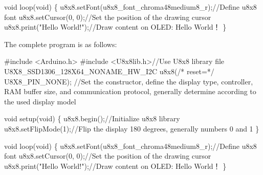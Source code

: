 \documentclass[
  letterpaper,
  DIV=11,
  numbers=noendperiod]{scrreprt}
\newenvironment{Shaded}{\begin{snugshade}}{\end{snugshade}}
\newcommand{\CommentTok}[1]{\textcolor[rgb]{0.37,0.37,0.37}{#1}}
\newcommand{\DataTypeTok}[1]{\textcolor[rgb]{0.68,0.00,0.00}{#1}}
\newcommand{\DecValTok}[1]{\textcolor[rgb]{0.68,0.00,0.00}{#1}}
\newcommand{\ImportTok}[1]{\textcolor[rgb]{0.00,0.46,0.62}{#1}}
\newcommand{\NormalTok}[1]{\textcolor[rgb]{0.00,0.23,0.31}{#1}}
\newcommand{\OperatorTok}[1]{\textcolor[rgb]{0.37,0.37,0.37}{#1}}
\newcommand{\PreprocessorTok}[1]{\textcolor[rgb]{0.68,0.00,0.00}{#1}}
\newcommand{\StringTok}[1]{\textcolor[rgb]{0.13,0.47,0.30}{#1}}
\begin{document}
\begin{Shaded}
\begin{Highlighting}[]
\DataTypeTok{void}\NormalTok{ loop}\OperatorTok{(}\DataTypeTok{void}\OperatorTok{)} \OperatorTok{\{}
\NormalTok{    u8x8}\OperatorTok{.}\NormalTok{setFont}\OperatorTok{(}\NormalTok{u8x8\_font\_chroma48medium8\_r}\OperatorTok{);}\CommentTok{//Define u8x8 font}
\NormalTok{    u8x8}\OperatorTok{.}\NormalTok{setCursor}\OperatorTok{(}\DecValTok{0}\OperatorTok{,} \DecValTok{0}\OperatorTok{);}\CommentTok{//Set the position of the drawing cursor}
\NormalTok{    u8x8}\OperatorTok{.}\NormalTok{print}\OperatorTok{(}\StringTok{"Hello World!"}\OperatorTok{);}\CommentTok{//Draw content on OLED: Hello World！}
\OperatorTok{\}}
\end{Highlighting}
\end{Shaded}

The complete program is as follows:

\begin{Shaded}
\begin{Highlighting}[]
\PreprocessorTok{\#include }\ImportTok{\textless{}Arduino.h\textgreater{}}
\PreprocessorTok{\#include }\ImportTok{\textless{}U8x8lib.h\textgreater{}}\CommentTok{//Use U8x8 library file}
\NormalTok{U8X8\_SSD1306\_128X64\_NONAME\_HW\_I2C u8x8}\OperatorTok{(}\CommentTok{/* reset=*/}\NormalTok{ U8X8\_PIN\_NONE}\OperatorTok{);}
\CommentTok{//Set the constructor, define the display type, controller, RAM buffer size, and communication protocol, generally determine according to the used display model}

\DataTypeTok{void}\NormalTok{ setup}\OperatorTok{(}\DataTypeTok{void}\OperatorTok{)} \OperatorTok{\{}
\NormalTok{    u8x8}\OperatorTok{.}\NormalTok{begin}\OperatorTok{();}\CommentTok{//Initialize u8x8 library}
\NormalTok{    u8x8}\OperatorTok{.}\NormalTok{setFlipMode}\OperatorTok{(}\DecValTok{1}\OperatorTok{);}\CommentTok{//Flip the display 180 degrees, generally numbers 0 and 1}
\OperatorTok{\}}

\DataTypeTok{void}\NormalTok{ loop}\OperatorTok{(}\DataTypeTok{void}\OperatorTok{)} \OperatorTok{\{}
\NormalTok{    u8x8}\OperatorTok{.}\NormalTok{setFont}\OperatorTok{(}\NormalTok{u8x8\_font\_chroma48medium8\_r}\OperatorTok{);}\CommentTok{//Define u8x8 font}
\NormalTok{    u8x8}\OperatorTok{.}\NormalTok{setCursor}\OperatorTok{(}\DecValTok{0}\OperatorTok{,} \DecValTok{0}\OperatorTok{);}\CommentTok{//Set the position of the drawing cursor}
\NormalTok{    u8x8}\OperatorTok{.}\NormalTok{print}\OperatorTok{(}\StringTok{"Hello World!"}\OperatorTok{);}\CommentTok{//Draw content on OLED: Hello World！}
\OperatorTok{\}}
\end{Highlighting}
\end{Shaded}
\end{document}
